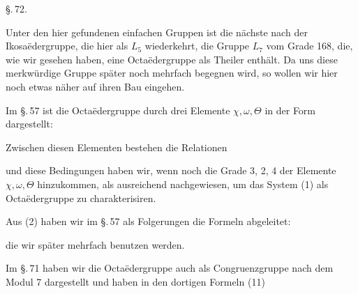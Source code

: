 
\begin{center}
\S.\,72.

\end{center}

Unter den hier gefundenen einfachen Gruppen ist die nächste nach der Ikosa\"edergruppe, die hier als $L_5$ wiederkehrt, die Gruppe $L_7$ vom Grade 168, die, wie wir gesehen haben, eine Octa\"edergruppe als Theiler enthält. Da uns diese merkwürdige Gruppe später noch mehrfach begegnen wird, so wollen wir hier noch etwas näher auf ihren Bau eingehen.

Im \S.\,57 ist die Octa\"edergruppe durch drei Elemente $\chi, \omega, \Theta$ in der Form dargestellt:


Zwischen diesen Elementen bestehen die Relationen


und diese Bedingungen haben wir, wenn noch die Grade 3, 2, 4 der Elemente $\chi, \omega, \Theta$ hinzukommen, als ausreichend nachgewiesen, um das System (1) als Octa\"edergruppe zu charakterisiren.

Aus (2) haben wir im \S.\,57 als Folgerungen die Formeln abgeleitet:


die wir später mehrfach benutzen werden.

Im \S.\,71 haben wir die Octa\"edergruppe auch als Congruenzgruppe nach dem Modul 7 dargestellt und haben in den dortigen Formeln (11)


